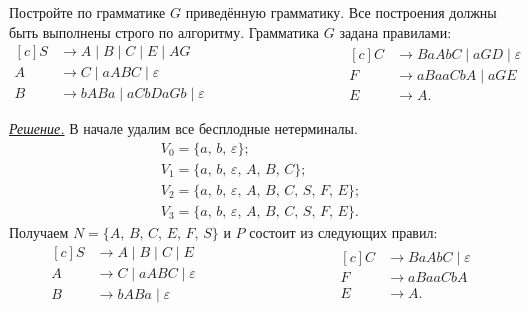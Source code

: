 \documentclass[10pt]{article}
\newcounter{pr} \setcounter{pr}{0}
\newenvironment{sol}
  {\par
   {\itshape \underline{Решение.}}}
  {}
\newcommand{\eps}{\varepsilon}
\begin{document}
  \title{\ptitle}
  \author{\pauthor, \pgroup}
  \date{\pdate}
  \maketitle
  \thispagestyle{fancytitlepage}
  \begin{pr}
    Постройте по грамматике $G$ приведённую грамматику. Все построения должны быть выполнены строго по алгоритму. Грамматика $G$ задана правилами:
    \begin{equation*}
      \begin{aligned}[c]
        S & \to A \mid B \mid C \mid E \mid AG \\
        A & \to C  \mid aABC \mid \eps \\
        B & \to bABa \mid aCbDaGb \mid \eps
      \end{aligned}
      \hspace{4cm}
      \begin{aligned}[c]
        C & \to BaAbC \mid aGD \mid \eps \\
        F & \to aBaaCbA \mid aGE \\
        E & \to A.
      \end{aligned}
    \end{equation*}
    \begin{sol}
      В начале удалим все бесплодные нетерминалы.
      \begin{gather*}
        V_0 = \{ a,\, b,\, \eps \}; \\
        V_1 = \{ a,\, b,\, \eps,\, A,\, B,\, C \}; \\
        V_2 = \{ a,\, b,\, \eps,\, A,\, B,\, C,\, S,\, F,\, E \}; \\
        V_3 = \{ a,\, b,\, \eps,\, A,\, B,\, C,\, S,\, F,\, E \}.
      \end{gather*}
      Получаем $N = \{ A,\, B,\, C,\, E,\, F,\, S \}$ и $P$ состоит из следующих правил:
      \begin{equation*}
        \begin{aligned}[c]
          S & \to A \mid B \mid C \mid E \\
          A & \to C  \mid aABC \mid \eps \\
          B & \to bABa \mid \eps
        \end{aligned}
        \hspace{4cm}
        \begin{aligned}[c]
          C & \to BaAbC \mid \eps \\
          F & \to aBaaCbA \\
          E & \to A.
        \end{aligned}
      \end{equation*}


\end{sol}
\end{pr}
\end{document}
